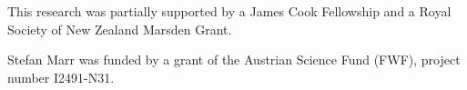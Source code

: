 
This research was partially supported by a James Cook Fellowship and a Royal Society of New Zealand Marsden Grant.

Stefan Marr was funded by a grant of the Austrian Science Fund (FWF), project number I2491-N31.